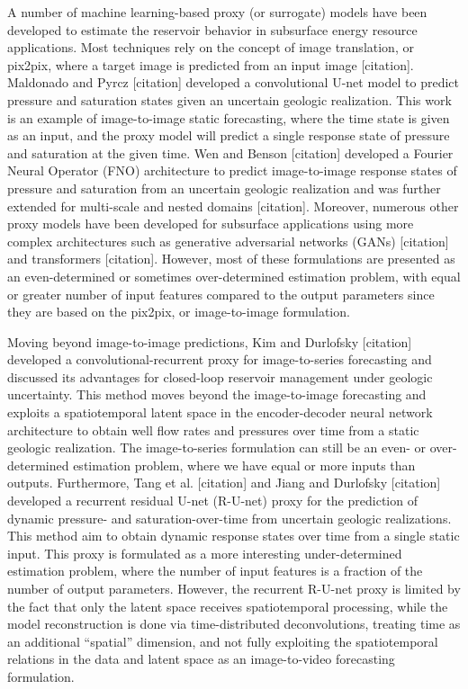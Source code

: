 \documentclass[10pt, twoside]{article}
\begin{document}
A number of machine learning-based proxy (or surrogate) models have been developed to estimate the reservoir behavior in subsurface energy resource applications. Most techniques rely on the concept of image translation, or pix2pix, where a target image is predicted from an input image [citation]. Maldonado and Pyrcz [citation] developed a convolutional U-net model to predict pressure and saturation states given an uncertain geologic realization. This work is an example of image-to-image static forecasting, where the time state is given as an input, and the proxy model will predict a single response state of pressure and saturation at the given time. Wen and Benson [citation] developed a Fourier Neural Operator (FNO) architecture to predict image-to-image response states of pressure and saturation from an uncertain geologic realization and was further extended for multi-scale and nested domains [citation]. Moreover, numerous other proxy models have been developed for subsurface applications using more complex architectures such as generative adversarial networks (GANs) [citation] and transformers [citation]. However, most of these formulations are presented as an even-determined or sometimes over-determined estimation problem, with equal or greater number of input features compared to the output parameters since they are based on the pix2pix, or image-to-image formulation.

Moving beyond image-to-image predictions, Kim and Durlofsky [citation] developed a convolutional-recurrent proxy for image-to-series forecasting and discussed its advantages for closed-loop reservoir management under geologic uncertainty. This method moves beyond the image-to-image forecasting and exploits a spatiotemporal latent space in the encoder-decoder neural network architecture to obtain well flow rates and pressures over time from a static geologic realization. The image-to-series formulation can still be an even- or over-determined estimation problem, where we have equal or more inputs than outputs. Furthermore, Tang et al. [citation] and Jiang and Durlofsky [citation] developed a recurrent residual U-net (R-U-net) proxy for the prediction of dynamic pressure- and saturation-over-time from uncertain geologic realizations. This method aim to obtain dynamic response states over time from a single static input. This proxy is formulated as a more interesting under-determined estimation problem, where the number of input features is a fraction of the number of output parameters. However, the recurrent R-U-net proxy is limited by the fact that only the latent space receives spatiotemporal processing, while the model reconstruction is done via time-distributed deconvolutions, treating time as an additional “spatial” dimension, and not fully exploiting the spatiotemporal relations in the data and latent space as an image-to-video forecasting formulation.
\end{document}
